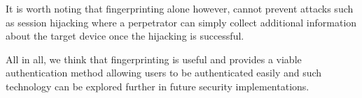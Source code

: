 \documentclass{acm_proc_article-sp}
\begin{document}
It is worth noting that fingerprinting alone however, cannot prevent attacks such as session hijacking where a perpetrator can simply collect additional information about the target device once the hijacking is successful.

All in all, we think that fingerprinting is useful and provides a viable authentication method allowing users to be authenticated easily and such technology can be explored further in future security implementations.




%
% 
% 
% 
%
\end{document}
